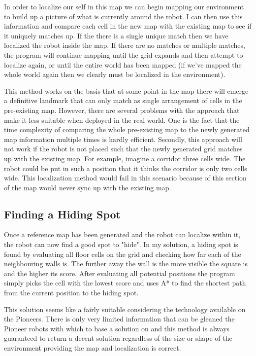 \documentclass{article}
\begin{document}
In order to localize our self in this map we can begin mapping our environment to build up a picture of what is currently around the robot. I can then use this information and compare each cell in the new map with the existing map to see if it uniquely matches up. If the there is a single unique match then we have localized the robot inside the map. If there are no matches or multiple matches, the program will continue mapping until the grid expands and then attempt to localize again, or until the entire world has been mapped (if we've mapped the whole world again then we clearly must be localized in the environment).

This method works on the basis that at some point in the map there will emerge a definitive landmark that can only match as single arrangement of cells in the pre-existing map. However, there are several problems with the approach that make it less suitable when deployed in the real world. One is the fact that the time complexity of comparing the whole pre-existing map to the newly generated map information multiple times is hardly efficient. Secondly, this approach will not work if the robot is not placed such that the newly generated grid matches up with the existing map. For example, imagine a corridor three cells wide. The robot could be put in such a position that it thinks the corridor is only two cells wide. This localization method would fail in this scenario because of this section of the map would never sync up with the existing map.

\subsection{Finding a Hiding Spot}
Once a reference map has been generated and the robot can localize within it, the robot can now find a good spot to "hide". In my solution, a hiding spot is found by evaluating all floor cells on the grid and checking how far each of the neighbouring walls is. The further away the wall is the more visible the square is and the higher its score. After evaluating all potential positions the program simply picks the cell with the lowest score and uses A* to find the shortest path from the current position to the hiding spot.

This solution seems like a fairly suitable considering the technology available on the Pioneers. There is only very limited information that can be gleaned the Pioneer robots with which to base a solution on and this method is always guaranteed to return a decent solution regardless of the size or shape of the environment providing the map and localization is correct.
\end{document}
